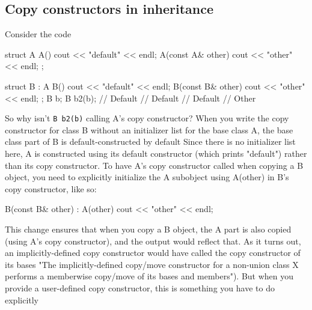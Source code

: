 \documentclass{report}
\begin{document}
    \subsection{Copy constructors in inheritance}
    \bigbreak \noindent 
    Consider the code
    \bigbreak \noindent 
    \begin{cppcode}
        struct A {
            A() { cout << "default" << endl; }
            A(const A& other) { cout << "other" << endl; }
        };

        struct B : A {
            B() { cout << "default" << endl; }
            B(const B& other) { cout << "other" << endl; }
        };
        B b;
        B b2(b);
        // Default
        // Default
        // Default
        // Other
    \end{cppcode}
    \bigbreak \noindent 
    So why isn't \texttt{B b2(b)} calling A's copy constructor?
    \bigbreak \noindent 
    When you write the copy constructor for class B without an initializer list for the base class A, the base class part of B is default-constructed by default
    \bigbreak \noindent 
    Since there is no initializer list here, A is constructed using its default constructor (which prints "default") rather than its copy constructor. To have A's copy constructor called when copying a B object, you need to explicitly initialize the A subobject using A(other) in B’s copy constructor, like so:
    \bigbreak \noindent 
    \begin{cppcode}
    B(const B& other) : A(other) { cout << "other" << endl; }
    \end{cppcode}
    \bigbreak \noindent 
    This change ensures that when you copy a B object, the A part is also copied (using A's copy constructor), and the output would reflect that.
    \bigbreak \noindent 
    As it turns out, an implicitly-defined copy constructor would have called the copy constructor of its bases "The implicitly-defined copy/move constructor for a non-union class X performs a memberwise copy/move of its bases and members"). But when you provide a user-defined copy constructor, this is something you have to do explicitly
\end{document}
